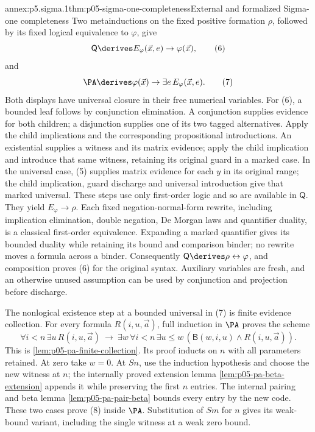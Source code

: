 \begin{annexitem}{annex:p5.sigma.1}{thm:p05-sigma-one-completeness}{External and formalized Sigma-one completeness}
Two metainductions on the fixed positive formation \(\rho\), followed
by its fixed logical equivalence to \(\varphi\), give
\[
 \mathsf Q\derives
   E_\varphi(\vec x,e)\to\varphi(\vec x),                          \tag{6}
\]
and
\[
 \PA\derives
   \varphi(\vec x)\to\exists e\,E_\varphi(\vec x,e).                \tag{7}
\]
Both displays have universal closure in their free numerical variables.
For (6), a bounded leaf follows by conjunction elimination. A conjunction
supplies evidence for both children; a disjunction supplies one of its two
tagged alternatives. Apply the child implications and the corresponding
propositional introductions. An existential supplies a witness and its
matrix evidence; apply the child implication and introduce that same
witness, retaining its original guard in a marked case. In the universal
case, (5) supplies matrix evidence for each \(y\) in its original range;
the child implication, guard discharge and universal introduction give
that marked universal. These steps use only first-order logic and so are
available in \(\mathsf Q\). They yield \(E_\varphi\to\rho\).
Each fixed negation-normal-form rewrite, including implication elimination,
double negation, De Morgan laws and quantifier duality, is a classical
first-order equivalence. Expanding a marked quantifier gives its bounded
duality while retaining its bound and comparison binder; no rewrite moves
a formula across a binder. Consequently \(\mathsf Q\derives
\rho\leftrightarrow\varphi\), and composition proves (6) for the
original syntax. Auxiliary variables are fresh, and an otherwise unused
assumption can be used by conjunction and projection before discharge.

The nonlogical existence step at a bounded universal in (7) is finite
evidence collection. For every formula \(R(i,u,\vec a)\), full induction
in \(\PA\) proves the scheme
\[
 \forall i<n\,\exists u\,R(i,u,\vec a)
 \ \to\
 \exists w\,\forall i<n\,\exists u\leq w\,
   (\mathsf B(w,i,u)\land R(i,u,\vec a)).                         \tag{8}
\]
This is \cref{lem:p05-pa-finite-collection}. Its proof inducts on \(n\)
with all parameters retained. At zero take \(w=0\). At \(Sn\), use
the induction hypothesis and choose the new witness at \(n\); the
internally proved extension lemma \cref{lem:p05-pa-beta-extension}
appends it while preserving the first \(n\) entries. The internal
pairing and beta lemma \cref{lem:p05-pa-pair-beta} bounds every entry by
the new code. These two cases prove (8) inside \(\PA\). Substitution
of \(Sm\) for \(n\) gives its weak-bound variant, including the
single witness at a weak zero bound.


\end{annexitem}
